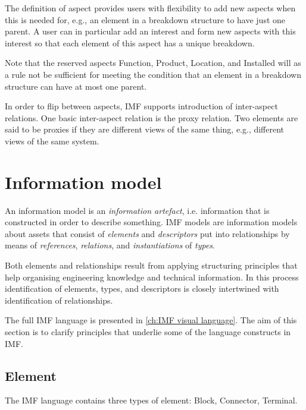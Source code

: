 \documentclass[../main.tex]{subfiles}
\begin{document}
The definition of aspect provides users with flexibility to add new aspects  when this is needed for, e.g., an
element  in a breakdown structure to have just one parent. A user can in particular add an interest and form new aspects with this interest so that each element of this aspect has a unique breakdown.  

Note that the reserved aspects Function, Product, Location, and Installed will as a rule not be sufficient for meeting the  condition  that an element  in a breakdown structure can  have at most one parent.

In order to flip between aspects, IMF supports introduction of inter-aspect relations. One basic inter-aspect relation is the proxy relation. Two elements are said to be proxies if they 
are different views of the same thing, e.g., different views of the same system. 

\section{Information model}
\label{sec:InformationModel}
An  information model is an \textit{information artefact}, i.e. information that is constructed  in order to describe something. 
IMF models are  information models about assets that consist of \textit{elements} and \textit{descriptors} put into relationships by means of \textit{references}, \textit{relations}, and \textit{instantiations} of \textit{types}.

Both  elements and  relationships  result from applying  structuring principles that help organising engineering knowledge and technical information. In this process  identification of  elements, types, and descriptors is closely intertwined with identification of relationships. 

The full IMF language is presented in \autoref{ch:IMF visual language}. The aim of this section is to clarify principles that underlie some of the language constructs in IMF. 

\subsection{Element}
\label{sec:Element}
The IMF language contains three types of element: Block, Connector, Terminal.   

\end{document}
